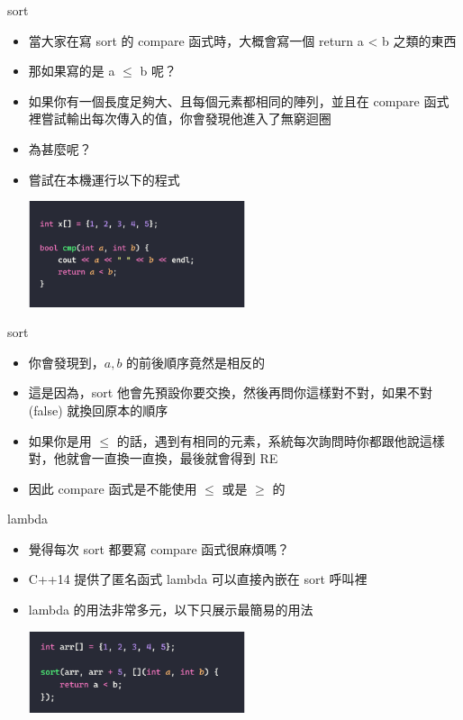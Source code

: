 \documentclass[aspectratio=169]{beamer}
\begin{document}
	\begin{frame}{sort}
		\begin{itemize}
			\item<1-> 當大家在寫 sort 的 compare 函式時，大概會寫一個 return a < b 之類的東西
			\item<2-> 那如果寫的是 a $\le$ b 呢？
			\item<3-> 如果你有一個長度足夠大、且每個元素都相同的陣列，並且在 compare 函式裡嘗試輸出每次傳入的值，你會發現他進入了無窮迴圈
			\item<4-> 為甚麼呢？
			\item<5-> 嘗試在本機運行以下的程式
			\begin{center}
				\includegraphics[width=0.5\textwidth]{./src/compare_1.png}\\
			\end{center} 
		\end{itemize}
	\end{frame}

	\begin{frame}{sort}
		\begin{itemize}
			\item<1-> 你會發現到，$a, b$ 的前後順序竟然是相反的
			\item<2-> 這是因為，sort 他會先預設你要交換，然後再問你這樣對不對，如果不對 (false) 就換回原本的順序
			\item<3-> 如果你是用 $\le$ 的話，遇到有相同的元素，系統每次詢問時你都跟他說這樣對，他就會一直換一直換，最後就會得到 RE
			\item<4-> 因此 compare 函式是不能使用 $\le$ 或是 $\ge$ 的
		\end{itemize}
	\end{frame}

	\begin{frame}{lambda}
		\begin{itemize}
			\item<1-> 覺得每次 sort 都要寫 compare 函式很麻煩嗎？
			\item<2-> C++14 提供了匿名函式 lambda 可以直接內嵌在 sort 呼叫裡
			\item<3-> lambda 的用法非常多元，以下只展示最簡易的用法\\
			\begin{center}
				\includegraphics[width=0.5\textwidth]{./src/lambda_1.png}
			\end{center}
		\end{itemize}
	\end{frame}
\end{document}
